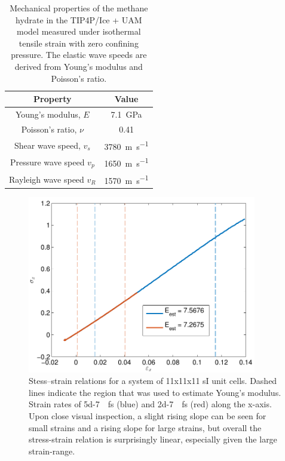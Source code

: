\begin{table}
\centering
\caption{Mechanical properties of the methane hydrate in the TIP4P/Ice + UAM model measured under isothermal tensile strain with zero confining pressure. The elastic wave speeds are derived from Young's modulus and Poisson's ratio.}
\label{tbl:mechanical_from_simulation}
\begin{tabular}{c|c}
Property & Value \\
\hline
Young's modulus, $E$ & \SI{7.1}{\giga\pascal} \\
Poisson's ratio, $\nu$ & 0.41 \\
Shear wave speed, $v_s$ & \SI{3780}{\meter\per\second} \\
Pressure wave speed $v_p$ & \SI{1650}{\meter\per\second} \\
Rayleigh wave speed $v_R$ & \SI{1570}{\meter\per\second} \\
\end{tabular}
\end{table}

\begin{figure}
\centering
\includegraphics[width=10cm]{../figures/thesis/stress_strain_11_11_11_tip4p_ice_uam.pdf}
\caption{Stess--strain relations for a system of 11x11x11 sI unit cells. Dashed lines indicate the region that was used to estimate Young's modulus. Strain rates of \SI{5d-7}{\per\femto\second} (blue) and \SI{2d-7}{\per\femto\second} (red) along the x-axis. Upon close visual inspection, a slight rising slope can be seen for small strains and a rising slope for large strains, but overall the stress-strain relation is surprisingly linear, especially given the large strain-range.}
\label{fig:stress_strain_11_11_11_tip4p_ice_uam}

\end{figure}

